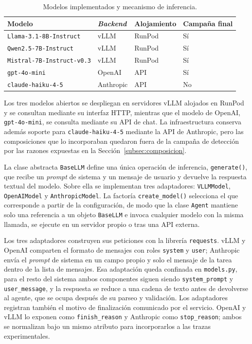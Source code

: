 \begin{table}[htbp]
	\centering
	\caption{Modelos implementados y mecanismo de inferencia.}
	\label{tab:modelos_backend}
	\small
	\begin{tabular}{p{4.8cm} p{2.2cm} p{2.6cm} p{2.4cm}}
		\hline
		\textbf{Modelo} & \textbf{\textit{Backend}} & \textbf{Alojamiento} &
		\textbf{Campaña final} \\
		\hline
		
		\texttt{Llama-3.1-8B-Instruct}   & vLLM      & RunPod & Sí \\
		\texttt{Qwen2.5-7B-Instruct}     & vLLM      & RunPod & Sí \\
		\texttt{Mistral-7B-Instruct-v0.3}& vLLM      & RunPod & Sí \\
		\texttt{gpt-4o-mini}             & OpenAI    & API    & Sí \\
		\texttt{claude-haiku-4-5}        & Anthropic & API    & No \\
		\hline
	\end{tabular}
\end{table}

\FloatBarrier

Los tres modelos abiertos se despliegan en servidores vLLM alojados en RunPod y se consultan mediante su interfaz HTTP, mientras que el modelo de OpenAI, \texttt{gpt-4o-mini}, se consulta mediante su API de chat. La infraestructura conserva además soporte para \texttt{claude-haiku-4-5} mediante la API de Anthropic, pero las composiciones que lo incorporaban quedaron fuera de la campaña de detección por las razones expuestas en la Sección~\ref{subsec:composicion}. 

La clase abstracta \texttt{BaseLLM} define una única operación de inferencia, \texttt{generate()}, que recibe un \textit{prompt} de sistema y un mensaje de usuario y devuelve la respuesta textual del modelo. Sobre ella se implementan tres adaptadores: \texttt{VLLMModel}, \texttt{OpenAIModel} y \texttt{AnthropicModel}. La factoría \texttt{create\_model()} selecciona el que corresponde a partir de la configuración, de modo que la clase \texttt{Agent} mantiene solo una referencia a un objeto \texttt{BaseLLM} e invoca cualquier modelo con la misma llamada, se ejecute en un servidor propio o tras una API externa.

Los tres adaptadores construyen sus peticiones con la librería \texttt{requests}. vLLM y OpenAI comparten el formato de mensajes con roles \texttt{system} y \texttt{user}; Anthropic envía el \textit{prompt} de sistema en un campo propio y solo el mensaje de la tarea dentro de la lista de mensajes. Esa adaptación queda confinada en \texttt{models.py}, para el resto del sistema ambos componentes siguen siendo \texttt{system\_prompt} y \texttt{user\_message}, y la respuesta se reduce a una cadena de texto antes de devolverse al agente, que se ocupa después de su parseo y validación. Los adaptadores registran también el motivo de finalización comunicado por el servicio. OpenAI y vLLM lo exponen como \texttt{finish\_reason} y Anthropic como \texttt{stop\_reason}; ambos se normalizan bajo un mismo atributo para incorporarlos a las trazas experimentales.

